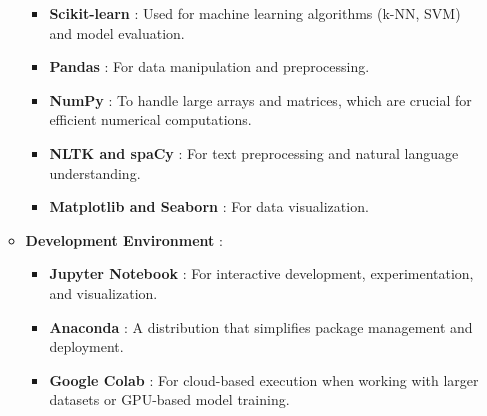 \begin{itemize}
\begin{itemize}
\begin{itemize}
                    \item \textbf{Scikit-learn} :
                    \noindent
                    Used for machine learning algorithms (k-NN, SVM) and model evaluation.

                    \item \textbf{Pandas} :
                    \noindent
                    For data manipulation and preprocessing.

                    \item \textbf{NumPy} :
                    \noindent
                    To handle large arrays and matrices, which are crucial for efficient numerical computations.

                    \item \textbf{NLTK and spaCy} :
                    \noindent
                    For text preprocessing and natural language understanding.

                    \item \textbf{Matplotlib and Seaborn} :
                    \noindent
                    For data visualization.
                    
                \end{itemize}

            \item \textbf{Development Environment} :
            \noindent
                \begin{itemize}
                    
                    \item \textbf{Jupyter Notebook} :
                    \noindent
                    For interactive development, experimentation, and visualization.

                    \item \textbf{Anaconda} :
                    \noindent
                    A distribution that simplifies package management and deployment.

                    \item \textbf{Google Colab} :
                    \noindent
                    For cloud-based execution when working with larger datasets or GPU-based model training.
                
                \end{itemize}
                
        \end{itemize}
    
\end{itemize}

